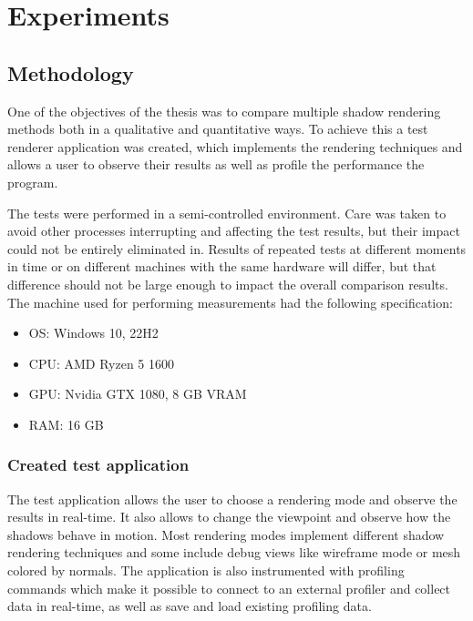 \chapter{Experiments}
\label{section:chapter_4}

\section{Methodology}
One of the objectives of the thesis was to compare multiple shadow rendering methods both in a qualitative and quantitative ways. To achieve this a test renderer application was created, which implements the rendering techniques and allows a user to observe their results as well as profile the performance the program.

The tests were performed in a semi-controlled environment. Care was taken to avoid other processes interrupting and affecting the test results, but their impact could not be entirely eliminated in. Results of repeated tests at different moments in time or on different machines with the same hardware will differ, but that difference should not be large enough to impact the overall comparison results. 
The machine used for performing measurements had the following specification:
\begin{itemize}
    \item OS: Windows 10, 22H2
    \item CPU: AMD Ryzen 5 1600
    \item GPU: Nvidia GTX 1080, 8 GB VRAM
    \item RAM: 16 GB
\end{itemize}

\subsection{Created test application}
The test application allows the user to choose a rendering mode and observe the results in real-time. It also allows to change the viewpoint and observe how the shadows behave in motion. Most rendering modes implement different shadow rendering techniques and some include debug views like wireframe mode or mesh colored by normals. The application is also instrumented with profiling commands which make it possible to connect to an external profiler and collect data in real-time, as well as save and load existing profiling data.


